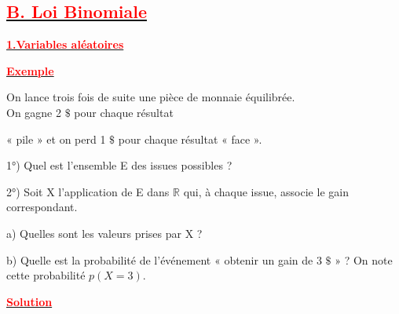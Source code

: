 \documentclass[12pt]{article}
\begin{document}
    
    
    
    
    
    
\subsection*{\underline{\textbf{\textcolor{red}{B. Loi Binomiale}}}}
\underline{\textbf{\textcolor{red}{1.Variables aléatoires}}}

\underline{\textbf{\textcolor{red}{Exemple}}}

On lance trois fois de suite une pièce de monnaie équilibrée.\\ On gagne 2 $\$ $ pour chaque résultat

« pile » et on perd 1 $\$ $ pour chaque résultat « face ».

1°) Quel est l’ensemble E des issues possibles ?

2°) Soit X l’application de E dans $\mathbb{R}$ qui, à chaque issue, associe le gain correspondant.

	a) Quelles sont les valeurs prises par X ?

	b) Quelle est la probabilité de l’événement « obtenir un gain de 3 $\$ $ » ? On note cette probabilité $p(X = 3)$.
	
\underline{\textbf{\textcolor{red}{Solution}}}
\end{document}
